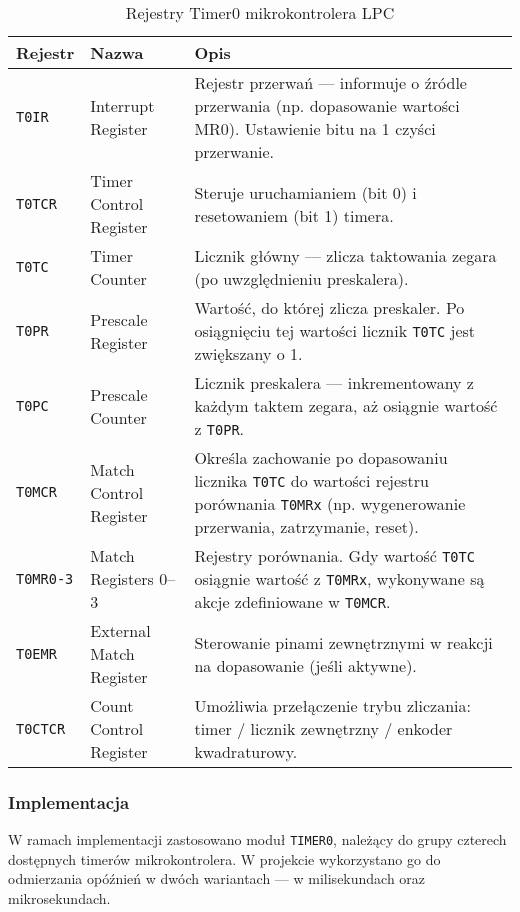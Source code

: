 \begin{table}[H]
\centering
\caption{Rejestry Timer0 mikrokontrolera LPC}
\begin{tabular}{|l|l|p{8cm}|}
\hline
\textbf{Rejestr} & \textbf{Nazwa} & \textbf{Opis} \\ \hline
\texttt{T0IR}    & Interrupt Register & Rejestr przerwań — informuje o źródle przerwania (np. dopasowanie wartości MR0). Ustawienie bitu na 1 czyści przerwanie. \\ \hline
\texttt{T0TCR}   & Timer Control Register & Steruje uruchamianiem (bit 0) i resetowaniem (bit 1) timera. \\ \hline
\texttt{T0TC}    & Timer Counter & Licznik główny — zlicza taktowania zegara (po uwzględnieniu preskalera). \\ \hline
\texttt{T0PR}    & Prescale Register & Wartość, do której zlicza preskaler. Po osiągnięciu tej wartości licznik \texttt{T0TC} jest zwiększany o 1. \\ \hline
\texttt{T0PC}    & Prescale Counter & Licznik preskalera — inkrementowany z każdym taktem zegara, aż osiągnie wartość z \texttt{T0PR}. \\ \hline
\texttt{T0MCR}   & Match Control Register & Określa zachowanie po dopasowaniu licznika \texttt{T0TC} do wartości rejestru porównania \texttt{T0MRx} (np. wygenerowanie przerwania, zatrzymanie, reset). \\ \hline
\texttt{T0MR0-3} & Match Registers 0–3 & Rejestry porównania. Gdy wartość \texttt{T0TC} osiągnie wartość z \texttt{T0MRx}, wykonywane są akcje zdefiniowane w \texttt{T0MCR}. \\ \hline
\texttt{T0EMR}   & External Match Register & Sterowanie pinami zewnętrznymi w reakcji na dopasowanie (jeśli aktywne). \\ \hline
\texttt{T0CTCR}  & Count Control Register & Umożliwia przełączenie trybu zliczania: timer / licznik zewnętrzny / enkoder kwadraturowy. \\ \hline
\end{tabular}
\end{table}


\subsubsection{Implementacja}

W ramach implementacji zastosowano moduł \texttt{TIMER0}, należący do grupy czterech dostępnych timerów mikrokontrolera. W projekcie wykorzystano go do odmierzania opóźnień w dwóch wariantach — w milisekundach oraz mikrosekundach.

